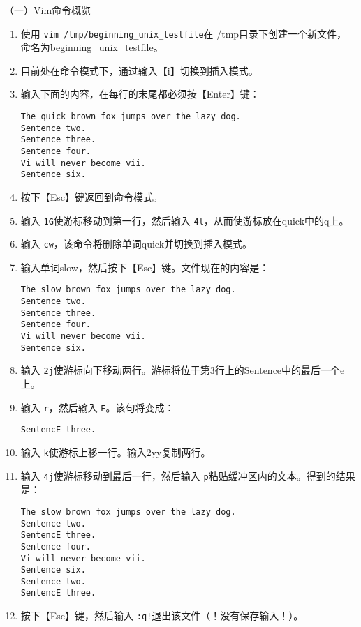 \vspace{0.1in}
（一）Vim命令概览
    \begin{enumerate}
      \item 使用 \verb|vim /tmp/beginning_unix_testfile|在 /tmp目录下创建一个新文件，命名为beginning\_unix\_testfile。
      \item 目前处在命令模式下，通过输入【i】切换到插入模式。
      \item 输入下面的内容，在每行的末尾都必须按【Enter】键：
\begin{verbatim}
The quick brown fox jumps over the lazy dog.
Sentence two.
Sentence three.
Sentence four.
Vi will never become vii.
Sentence six.
\end{verbatim}
      \item 按下【Esc】键返回到命令模式。
      \item 输入 \verb|1G|使游标移动到第一行，然后输入 \verb|4l|，从而使游标放在quick中的q上。
      \item 输入 \verb|cw|，该命令将删除单词quick并切换到插入模式。
      \item 输入单词slow，然后按下【Esc】键。文件现在的内容是：
\begin{verbatim}
The slow brown fox jumps over the lazy dog.
Sentence two.
Sentence three.
Sentence four.
Vi will never become vii.
Sentence six.
\end{verbatim}
      \item 输入 \verb|2j|使游标向下移动两行。游标将位于第3行上的Sentence中的最后一个e上。
      \item 输入 \verb|r|，然后输入 \verb|E|。该句将变成：
\begin{verbatim}
SentencE three.
\end{verbatim}
      \item 输入 \verb|k|使游标上移一行。输入2yy复制两行。
      \item 输入 \verb|4j|使游标移动到最后一行，然后输入 \verb|p|粘贴缓冲区内的文本。得到的结果是：
\begin{verbatim}
The slow brown fox jumps over the lazy dog.
Sentence two.
SentencE three.
Sentence four.
Vi will never become vii.
Sentence six.
Sentence two.
SentencE three.
\end{verbatim}
      \item 按下【Esc】键，然后输入 \verb|:q!|退出该文件（！没有保存输入！）。
    \end{enumerate}

